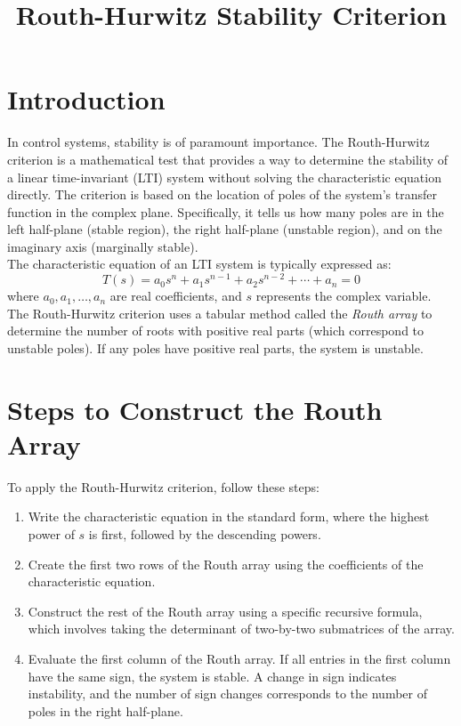 \documentclass[a4paper,12pt]{article}
\title{Routh-Hurwitz Stability Criterion}
\date{}
\begin{document}
\maketitle

\section{Introduction}

In control systems, stability is of paramount importance. The Routh-Hurwitz criterion is a mathematical test that provides a way to determine the stability of a linear time-invariant (LTI) system without solving the characteristic equation directly. The criterion is based on the location of poles of the system's transfer function in the complex plane. Specifically, it tells us how many poles are in the left half-plane (stable region), the right half-plane (unstable region), and on the imaginary axis (marginally stable).\\

The characteristic equation of an LTI system is typically expressed as:
\begin{equation}
T(s) = a_0 s^n + a_1 s^{n-1} + a_2 s^{n-2} + \cdots + a_n = 0
\end{equation}
where \(a_0, a_1, \ldots, a_n\) are real coefficients, and \(s\) represents the complex variable.\\

The Routh-Hurwitz criterion uses a tabular method called the \textit{Routh array} to determine the number of roots with positive real parts (which correspond to unstable poles). If any poles have positive real parts, the system is unstable.

\section{Steps to Construct the Routh Array}

To apply the Routh-Hurwitz criterion, follow these steps:

\begin{enumerate}
    \item Write the characteristic equation in the standard form, where the highest power of \(s\) is first, followed by the descending powers.
    \item Create the first two rows of the Routh array using the coefficients of the characteristic equation.
    \item Construct the rest of the Routh array using a specific recursive formula, which involves taking the determinant of two-by-two submatrices of the array.
    \item Evaluate the first column of the Routh array. If all entries in the first column have the same sign, the system is stable. A change in sign indicates instability, and the number of sign changes corresponds to the number of poles in the right half-plane.
\end{enumerate}
\end{document}
